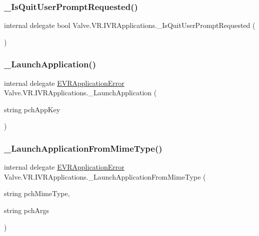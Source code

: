 \subsubsection{\texorpdfstring{\_IsQuitUserPromptRequested()}{\_IsQuitUserPromptRequested()}}
{\footnotesize\ttfamily internal delegate bool Valve.\+V\+R.\+I\+V\+R\+Applications.\+\_\+\+Is\+Quit\+User\+Prompt\+Requested (\begin{DoxyParamCaption}{ }\end{DoxyParamCaption})}

\mbox{\label{struct_valve_1_1_v_r_1_1_i_v_r_applications_acc906c27dba9c0fbc2398ae17e058352}} 
\subsubsection{\texorpdfstring{\_LaunchApplication()}{\_LaunchApplication()}}
{\footnotesize\ttfamily internal delegate \mbox{\hyperlink{namespace_valve_1_1_v_r_a3488adab8a219b579fcee50f4e63a8b6}{E\+V\+R\+Application\+Error}} Valve.\+V\+R.\+I\+V\+R\+Applications.\+\_\+\+Launch\+Application (\begin{DoxyParamCaption}\item[{string}]{pch\+App\+Key }\end{DoxyParamCaption})}

\mbox{\label{struct_valve_1_1_v_r_1_1_i_v_r_applications_afcb2effe091e7d38b37d3eaac945c8ef}} 
\subsubsection{\texorpdfstring{\_LaunchApplicationFromMimeType()}{\_LaunchApplicationFromMimeType()}}
{\footnotesize\ttfamily internal delegate \mbox{\hyperlink{namespace_valve_1_1_v_r_a3488adab8a219b579fcee50f4e63a8b6}{E\+V\+R\+Application\+Error}} Valve.\+V\+R.\+I\+V\+R\+Applications.\+\_\+\+Launch\+Application\+From\+Mime\+Type (\begin{DoxyParamCaption}\item[{string}]{pch\+Mime\+Type,  }\item[{string}]{pch\+Args }\end{DoxyParamCaption})}

